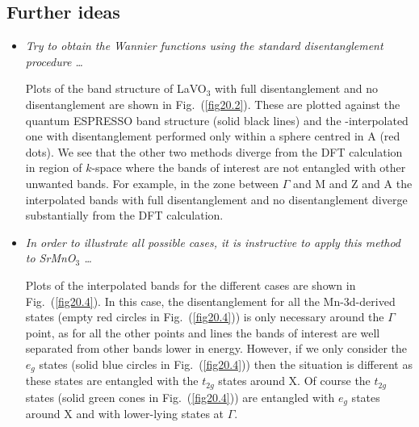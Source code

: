 \subsection*{Further ideas}
\begin{itemize}
	\item {\it Try to obtain the Wannier functions using the standard disentanglement procedure \dots}

	Plots of the band structure of LaVO$_3$ with full disentanglement and no disentanglement are shown in Fig.~(\ref{fig20.2}). These are plotted against the quantum ESPRESSO band structure (solid black lines) and the \Wannier{}-interpolated one with disentanglement performed only within a sphere centred in A (red dots). We see that the other two methods diverge from the DFT calculation in region of $k$-space where the bands of interest are not entangled with other unwanted bands. For example, in the zone between $\Gamma$ and M and Z and A the interpolated bands with full disentanglement and no disentanglement diverge substantially from the DFT calculation.

	\item {\it In order to illustrate all possible cases, it is instructive to apply this method to SrMnO$_3$ \dots}

	Plots of the interpolated bands for the different cases are shown in Fig.~(\ref{fig20.4}). In this case, the disentanglement for all the Mn-3d-derived states (empty red circles in Fig.~(\ref{fig20.4})) is only necessary around the $\Gamma$ point, as for all the other points and lines the bands of interest are well separated from other bands lower in energy. However, if we only consider the $e_g$ states (solid blue circles in Fig.~(\ref{fig20.4})) then the situation is different as these states are entangled with the $t_{2g}$ states around X. Of course the $t_{2g}$ states (solid green cones in Fig.~(\ref{fig20.4})) are entangled with $e_{g}$ states around X and with lower-lying states at $\Gamma$.

\end{itemize}

